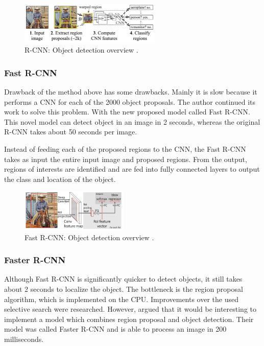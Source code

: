 \begin{figure}[ht]
\begin{center}
\includegraphics[height=2cm,keepaspectratio]{images/2_literature/r-cnn.png}
\end{center}
\caption{R-CNN: Object detection overview \cite{Girshick2013}.}
\end{figure}

\subsubsection{Fast R-CNN}
Drawback of the method above has some drawbacks. Mainly it is slow because it performs a CNN for each of the 2000 object proposals. The author continued its work to solve this problem. With the new proposed model called Fast R-CNN. This novel model can detect object in an image in 2 seconds, whereas the original R-CNN takes about 50 seconds per image.

Instead of feeding each of the proposed regions to the CNN, the Fast R-CNN takes as input the entire input image and proposed regions. From the output, regions of interests are identified and are fed into fully connected layers to output the class and location of the object. 

\begin{figure}[ht]
\begin{center}
\includegraphics[height=2cm,keepaspectratio]{images/2_literature/fast-r-cnn.png}
\end{center}
\caption{Fast R-CNN: Object detection overview \cite{Girshick2013}.}
\end{figure}

\subsubsection{Faster R-CNN}
Although Fast R-CNN is significantly quicker to detect objects, it still takes about 2 seconds to localize the object. The bottleneck is the region proposal algorithm, which is implemented on the CPU. Improvements over the used selective search were researched. However,  argued that it would be interesting to implement a model which combines region proposal and object detection. Their model was called Faster R-CNN and is able to process an image in 200 milliseconds. 

